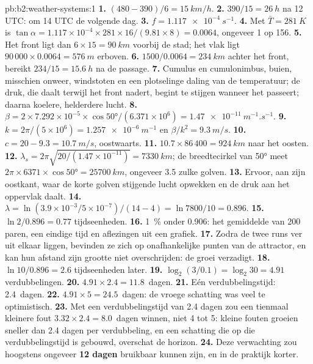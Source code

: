 \begin{solution}{pb:b2:weather-systems:1}
\textbf{1.} $(480 - 390)/6 = \qty{15}{km/h}$.
\textbf{2.} $390/15 = \qty{26}{h}$ na 12 UTC: om 14 UTC de volgende dag.
\textbf{3.} $f = \qty{1.117e-4}{s^{-1}}$.
\textbf{4.} Met $\bar T = \qty{281}{K}$ is $\tan\alpha = 1.117 \times 10^{-4} \times 281 \times
16/(9.81 \times 8) = 0.0064$, ongeveer 1 op 156.
\textbf{5.} Het front ligt dan $6 \times 15 = \qty{90}{km}$ voorbij de stad; het vlak ligt
$90\,000 \times 0.0064 = \qty{576}{m}$ erboven.
\textbf{6.} $1500/0.0064 = \qty{234}{km}$ achter het front, bereikt $234/15 = \qty{15.6}{h}$ na
de passage.
\textbf{7.} Cumulus en cumulonimbus, buien, misschien onweer, windstoten en een plotselinge daling van de
temperatuur; de druk, die daalt terwijl het front nadert, begint te stijgen wanneer het passeert; daarna
koelere, helderdere lucht.
\textbf{8.} $\beta = 2 \times 7.292 \times 10^{-5} \times \cos\ang{50}/(6.371 \times 10^6) =
\qty{1.47e-11}{m^{-1}.s^{-1}}$.
\textbf{9.} $k = 2\pi/(5 \times 10^6) = \qty{1.257e-6}{m^{-1}}$ en $\beta/k^2 = \qty{9.3}{m/s}$.
\textbf{10.} $c = 20 - 9.3 = \qty{10.7}{m/s}$, oostwaarts.
\textbf{11.} $10.7 \times 86\,400 = \qty{924}{km}$ naar het oosten.
\textbf{12.} $\lambda_s = 2\pi\sqrt{20/(1.47 \times 10^{-11})} = \qty{7330}{km}$; de
breedtecirkel van \ang{50} meet $2\pi \times 6371 \times \cos\ang{50} = \qty{25700}{km}$, ongeveer 3.5
zulke golven.
\textbf{13.} Ervoor, aan zijn oostkant, waar de korte golven stijgende lucht opwekken en de
druk aan het oppervlak daalt.
\textbf{14.} $\lambda = \ln(3.9 \times 10^{-3}/5 \times 10^{-7})/(14 - 4) = \ln 7800/10 = 0.896$.
\textbf{15.} $\ln 2/0.896 = 0.77$ tijdseenheden.
\textbf{16.} \qty{1}{\percent} onder 0.906: het gemiddelde van 200 paren, een eindige tijd en aflezingen uit
een grafiek.
\textbf{17.} Zodra de twee runs ver uit elkaar liggen, bevinden ze zich op onafhankelijke punten van de attractor, en
kan hun afstand zijn grootte niet overschrijden: de groei verzadigt.
\textbf{18.} $\ln 10/0.896 = 2.6$ tijdseenheden later.
\textbf{19.} $\log_2(3/0.1) = \log_2 30 = 4.91$ verdubbelingen.
\textbf{20.} $4.91 \times 2.4 = 11.8$~dagen.
\textbf{21.} Eén verdubbelingstijd: 2.4~dagen.
\textbf{22.} $4.91 \times 5 = 24.5$~dagen: de vroege schatting was veel te optimistisch.
\textbf{23.} Met een verdubbelingstijd van 2.4 dagen zou een tienmaal kleinere fout $3.32 \times 2.4
= 8.0$~dagen winnen, niet 4 tot 5: kleine fouten groeien sneller dan 2.4 dagen per verdubbeling, en een
schatting die op die verdubbelingstijd is gebouwd, overschat de horizon.
\textbf{24.} Deze verwachting zou hoogstens ongeveer \textbf{12 dagen} bruikbaar kunnen zijn, en in de praktijk
korter.
\end{solution}

